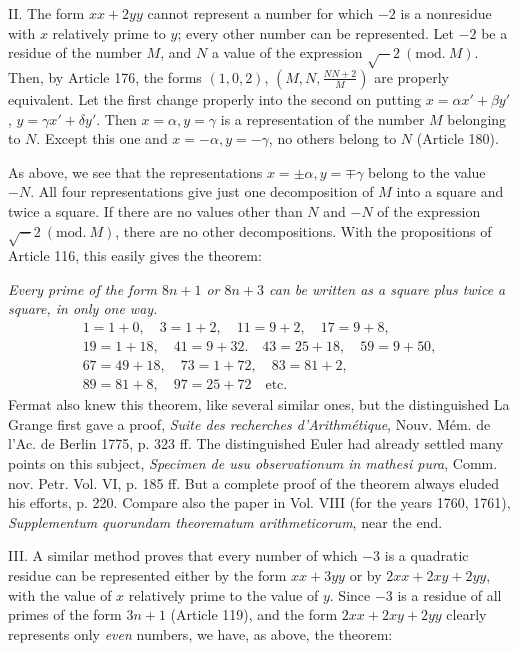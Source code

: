 II. The form $xx+2yy$ cannot represent a number for which $-2$ is a nonresidue with $x$ relatively prime to $y$; every other number can be represented. Let $-2$ be a residue of the number $M$, and $N$ a value of the expression $\surd-2\ (\mathrm{mod.}\ M)$. Then, by Article 176, the forms $(1,0,2)$, $(M,N,\frac{NN+2}{M})$ are properly equivalent. Let the first change properly into the second on putting $x=\alpha x'+\beta y'$, $y=\gamma x'+\delta y'$. Then $x=\alpha,y=\gamma$ is a representation of the number $M$ belonging to $N$. Except this one and $x=-\alpha,y=-\gamma$, no others belong to $N$ (Article 180).

As above, we see that the representations $x=\pm\alpha,y=\mp\gamma$ belong to the value $-N$. All four representations give just one decomposition of $M$ into a square and twice a square. If there are no values other than $N$ and $-N$ of the expression $\surd-2\ (\mathrm{mod.}\ M)$, there are no other decompositions. With the propositions of Article 116, this easily gives the theorem:

\textit{Every prime of the form $8n+1$ or $8n+3$ can be written as a square plus twice a square, in only one way.}
\[
\begin{gathered}
1=1+0,\quad3=1+2,\quad11=9+2,\quad17=9+8,\\
19=1+18,\quad41=9+32.\quad43=25+18,\quad59=9+50,\\
67=49+18,\quad73=1+72,\quad83=81+2,\\
89=81+8,\quad97=25+72\quad\text{etc.}
\end{gathered}
\]
Fermat also knew this theorem, like several similar ones, but the distinguished La Grange first gave a proof, \textit{Suite des recherches d'Arithmétique}, Nouv. Mém. de l'Ac. de Berlin 1775, p. 323 ff. The distinguished Euler had already settled many points on this subject, \textit{Specimen de usu observationum in mathesi pura}, Comm. nov. Petr. Vol. VI, p. 185 ff. But a complete proof of the theorem always eluded his efforts, p. 220. Compare also the paper in Vol. VIII (for the years 1760, 1761), \textit{Supplementum quorundam theorematum arithmeticorum}, near the end.

III. A similar method proves that every number of which $-3$ is a quadratic residue can be represented either by the form $xx+3yy$ or by $2xx+2xy+2yy$, with the value of $x$ relatively prime to the value of $y$. Since $-3$ is a residue of all primes of the form $3n+1$ (Article 119), and the form $2xx+2xy+2yy$ clearly represents only \textit{even} numbers, we have, as above, the theorem:

